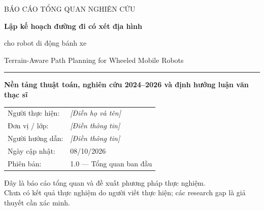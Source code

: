 \documentclass[11pt,a4paper]{article}
\begin{document}
\begin{titlepage}
\vspace*{1.7cm}
{\sffamily\color{accent}\large BÁO CÁO TỔNG QUAN NGHIÊN CỨU\par}
\vspace{1.1cm}
{\sffamily\bfseries\color{ink}\fontsize{23}{30}\selectfont
Lập kế hoạch đường đi có xét địa hình\par
cho robot di động bánh xe\par}
\vspace{0.4cm}
{\sffamily\fontsize{16}{22}\selectfont
Terrain-Aware Path Planning for Wheeled Mobile Robots\par}
\vspace{0.7cm}
{\color{accent}\rule{\textwidth}{1.3pt}}
\vspace{0.35cm}

{\large\textbf{Nền tảng thuật toán, nghiên cứu 2024--2026 và định hướng luận văn thạc sĩ}\par}
\vspace{1cm}
\begin{tabular}{@{}ll@{}}
Người thực hiện: & \textit{[Điền họ và tên]}\\
Đơn vị / lớp: & \textit{[Điền thông tin]}\\
Người hướng dẫn: & \textit{[Điền thông tin]}\\
Ngày cập nhật: & 08/10/2026\\
Phiên bản: & 1.0 --- Tổng quan ban đầu
\end{tabular}
\vfill
{\small\color{ink}Đây là báo cáo tổng quan và đề xuất phương pháp thực nghiệm.\\
Chưa có kết quả thực nghiệm do người viết thực hiện; các research gap là giả thuyết cần xác minh.}
\end{titlepage}

\begin{abstract}
\noindent
\textbf{Tóm tắt.}
Robot bánh xe tự hành (wheeled unmanned ground vehicle, UGV) hoạt động trên
địa hình phi cấu trúc cần lựa chọn đường đi không chỉ ngắn mà còn an toàn,
khả thi về chuyển động và thích ứng khi thông tin bản đồ thay đổi.
Báo cáo này giới thiệu các khái niệm terrain traversability, 2.5D elevation map,
path planning và motion planning; phân tích các nhóm thuật toán A*, D* Lite,
RRT* và Hybrid A*. Tiếp theo là tổng hợp những công trình 2024--2026 về
rủi ro địa hình, nhận thức đa cảm biến, heuristic học được và ràng buộc
động học. Dựa trên đối chiếu tài liệu, báo cáo đề xuất các câu hỏi nghiên cứu
về hiệu chuẩn rủi ro, online replanning và traversability phụ thuộc hướng,
cùng với bộ baseline và quy trình đánh giá có thể tái lập. Mục tiêu của báo cáo
là định hướng nghiên cứu thạc sĩ, không tuyên bố một thuật toán hoặc kết quả mới.

\medskip\noindent\textbf{Từ khóa:} UGV; uneven terrain; off-road planning;
terrain traversability; risk-aware path planning; D* Lite; Hybrid A*.
\end{abstract}
\tableofcontents
\clearpage
\end{document}
